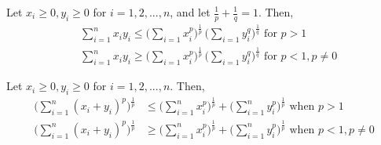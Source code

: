   \begin{lemma}
    Let $x_i \geq 0, y_i \geq 0$ for $i = 1, 2, ..., n$, and let $\frac{1}{p} + \frac{1}{q} = 1$. Then, 
    \begin{align*}
        &\sum_{i=1}^n x_i y_i \leq \bigg( \sum_{i=1} x_i^p \bigg)^{\frac{1}{p}} \, \bigg( \sum_{i=1} y_i^q \bigg)^{\frac{1}{q}} \text{  for } p > 1 \\
        &\sum_{i=1}^n x_i y_i \geq \bigg( \sum_{i=1} x_i^p \bigg)^{\frac{1}{p}} \, \bigg( \sum_{i=1} y_i^q \bigg)^{\frac{1}{q}} \text{  for } p < 1, p \neq 0
    \end{align*}
  \end{lemma}

  \begin{lemma}
    Let $x_i \geq 0, y_i \geq 0$ for $i = 1, 2, ... ,n$. Then, 
    \begin{align*}
        \bigg( \sum_{i=1}^n (x_i + y_i)^p \bigg)^{\frac{1}{p}} & \leq \bigg( \sum_{i=1}^n x_i^p \bigg)^\frac{1}{p} + \bigg( \sum_{i=1}^n y_i^p \bigg)^{\frac{1}{p}} \text{  when } p > 1 \\
        \bigg( \sum_{i=1}^n (x_i + y_i)^p \bigg)^{\frac{1}{p}} & \geq \bigg( \sum_{i=1}^n x_i^p \bigg)^\frac{1}{p} + \bigg( \sum_{i=1}^n y_i^p \bigg)^{\frac{1}{p}} \text{  when } p < 1, p \neq 0
    \end{align*}
  \end{lemma}

